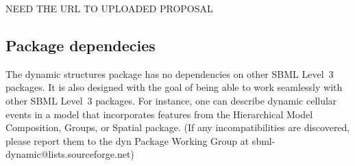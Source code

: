 NEED THE URL TO UPLOADED PROPOSAL





\subsection{Package dependecies}
\label{subsec:dependencies}

The dynamic structures package has no dependencies on other SBML Level~3 packages. It is also designed with the goal of being able to work seamlessly with other SBML Level~3 packages. For instance, one can describe dynamic cellular events in a model that incorporates features from the Hierarchical Model Composition, Groups, or Spatial package. (If any incompatibilities are discovered, please report them to the dyn Package Working Group at sbml-dynamic@lists.sourceforge.net)

